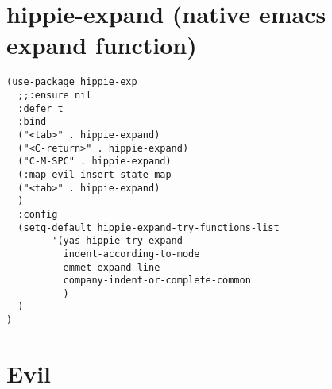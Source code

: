\documentclass[11pt]{article}
\begin{document}
\section*{hippie-expand (native emacs expand function)}
\label{sec:org7f90654}

\begin{verbatim}
(use-package hippie-exp
  ;;:ensure nil
  :defer t
  :bind
  ("<tab>" . hippie-expand)
  ("<C-return>" . hippie-expand)
  ("C-M-SPC" . hippie-expand)
  (:map evil-insert-state-map
  ("<tab>" . hippie-expand)
  )
  :config
  (setq-default hippie-expand-try-functions-list
        '(yas-hippie-try-expand
          indent-according-to-mode
          emmet-expand-line
          company-indent-or-complete-common
          )
  )
)
\end{verbatim}


\section*{Evil}
\label{sec:org9f6af6e}
\end{document}
